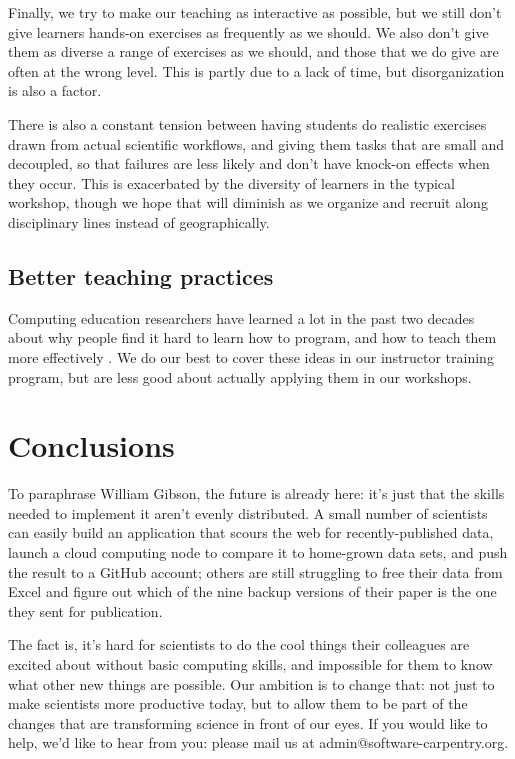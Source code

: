 \documentclass[10pt,a4paper,twocolumn]{article}
\begin{document}
Finally, we try to make our teaching as interactive as possible, but
we still don't give learners hands-on exercises as frequently as we
should.  We also don't give them as diverse a range of exercises as we
should, and those that we do give are often at the wrong level. This
is partly due to a lack of time, but disorganization is also a factor.

There is also a constant tension between having students do realistic
exercises drawn from actual scientific workflows, and giving them tasks
that are small and decoupled, so that failures are less likely and don't
have knock-on effects when they occur. This is exacerbated by the
diversity of learners in the typical workshop, though we hope that will
diminish as we organize and recruit along disciplinary lines instead of
geographically.

\subsection*{Better teaching practices}

Computing education researchers have learned a lot in the past two
decades about why people find it hard to learn how to program, and how
to teach them more effectively
\cite{guzdial2010,guzdial2013,hazzan2011,porter2013,sorva2012}.  We
do our best to cover these ideas in our instructor training program,
but are less good about actually applying them in our workshops.

\section*{Conclusions}

To paraphrase William Gibson, the future is already here: it's just
that the skills needed to implement it aren't evenly distributed. A
small number of scientists can easily build an application that scours
the web for recently-published data, launch a cloud computing node to
compare it to home-grown data sets, and push the result to a GitHub
account; others are still struggling to free their data from Excel and
figure out which of the nine backup versions of their paper is the one
they sent for publication.

The fact is, it's hard for scientists to do the cool things their
colleagues are excited about without basic computing skills, and
impossible for them to know what other new things are possible. Our
ambition is to change that: not just to make scientists more productive
today, but to allow them to be part of the changes that are transforming
science in front of our eyes. If you would like to help, we'd like to
hear from you: please mail us at admin@software-carpentry.org.
\end{document}
